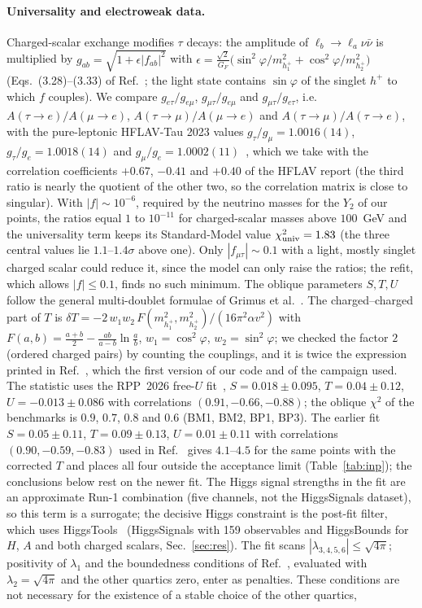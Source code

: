 \documentclass[twocolumn,epjc3]{svjour3}
\newcommand{\HG}{Ref.~\cite{HerreroGarcia:2017xdq}}
\begin{document}
\paragraph{Universality and electroweak data.} Charged-scalar exchange modifies $\tau$ decays: the amplitude of $\ell_b\to\ell_a\nu\bar\nu$ is multiplied by $g_{ab}=\sqrt{1+\epsilon|f_{ab}|^2}$ with $\epsilon=\frac{\sqrt2}{G_F}\big(\sin^2\!\varphi/m_{h_1^+}^2+\cos^2\!\varphi/m_{h_2^+}^2\big)$ (Eqs.~(3.28)--(3.33) of \HG{}; the light state contains $\sin\varphi$ of the singlet $h^+$ to which $f$ couples). We compare $g_{e\tau}/g_{e\mu}$, $g_{\mu\tau}/g_{e\mu}$ and $g_{\mu\tau}/g_{e\tau}$, i.e.\ $A(\tau\to e)/A(\mu\to e)$, $A(\tau\to\mu)/A(\mu\to e)$ and $A(\tau\to\mu)/A(\tau\to e)$, with the pure-leptonic HFLAV-Tau 2023 values $g_\tau/g_\mu=1.0016(14)$, $g_\tau/g_e=1.0018(14)$ and $g_\mu/g_e=1.0002(11)$~\cite{HFLAV:2024ctg}, which we take with the correlation coefficients $+0.67$, $-0.41$ and $+0.40$ of the HFLAV report (the third ratio is nearly the quotient of the other two, so the correlation matrix is close to singular). With $|f|\sim10^{-6}$, required by the neutrino masses for the $Y_2$ of our points, the ratios equal $1$ to $10^{-11}$ for charged-scalar masses above $100$~GeV and the universality term keeps its Standard-Model value $\chi^2_{\rm univ}=1.83$ (the three central values lie $1.1$--$1.4\sigma$ above one). Only $|f_{\mu\tau}|\sim0.1$ with a light, mostly singlet charged scalar could reduce it, since the model can only raise the ratios; the refit, which allows $|f|\le0.1$, finds no such minimum. The oblique parameters $S,T,U$ follow the general multi-doublet formulae of Grimus et al.~\cite{Grimus:2007if}. The charged--charged part of $T$ is $\delta T=-2\,w_1w_2\,F(m_{h_1^+}^2,m_{h_2^+}^2)/(16\pi^2\alpha v^2)$ with $F(a,b)=\tfrac{a+b}{2}-\tfrac{ab}{a-b}\ln\tfrac ab$, $w_1=\cos^2\!\varphi$, $w_2=\sin^2\!\varphi$; we checked the factor $2$ (ordered charged pairs) by counting the couplings, and it is twice the expression printed in \HG{}, which the first version of our code and of the campaign used. The statistic uses the RPP~2026 free-$U$ fit~\cite{PDG:2026}, $S=0.018\pm0.095$, $T=0.04\pm0.12$, $U=-0.013\pm0.086$ with correlations $(0.91,-0.66,-0.88)$; the oblique $\chi^2$ of the benchmarks is $0.9$, $0.7$, $0.8$ and $0.6$ (BM1, BM2, BP1, BP3). The earlier fit $S=0.05\pm0.11$, $T=0.09\pm0.13$, $U=0.01\pm0.11$ with correlations $(0.90,-0.59,-0.83)$ used in \HG{} gives $4.1$--$4.5$ for the same points with the corrected $T$ and places all four outside the acceptance limit (Table~\ref{tab:inp}); the conclusions below rest on the newer fit. The Higgs signal strengths in the fit are an approximate Run-1 combination (five channels, not the HiggsSignals dataset), so this term is a surrogate; the decisive Higgs constraint is the post-fit filter, which uses HiggsTools~\cite{Bahl:2022igd} (HiggsSignals with 159 observables and HiggsBounds for $H$, $A$ and both charged scalars, Sec.~\ref{sec:res}). The fit scans $|\lambda_{3,4,5,6}|\le\sqrt{4\pi}$; positivity of $\lambda_1$ and the boundedness conditions of \HG{}, evaluated with $\lambda_2=\sqrt{4\pi}$ and the other quartics zero, enter as penalties. These conditions are not necessary for the existence of a stable choice of the other quartics, 
\end{document}
